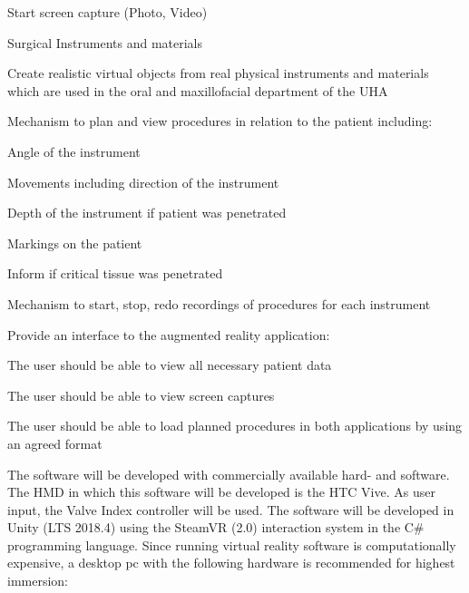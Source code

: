 \begin{compactenum}[label=(\alph*)]
\begin{compactenum}[label=(\alph*)]
            \item Start screen capture (Photo, Video)
        \end{compactenum}
    \item Surgical Instruments and materials
        \begin{compactenum}[label=(\alph*)]
            \item Create realistic virtual objects from real physical instruments and materials which are used in the oral and maxillofacial department of the UHA
            \item Mechanism to plan and view procedures in relation to the patient including:          
                \begin{compactenum}[label=(\alph*)]
                    \item Angle of the instrument
                    \item Movements including direction of the instrument
                    \item Depth of the instrument if patient was penetrated
                    \item Markings on the patient
                    \item Inform if critical tissue was penetrated
                \end{compactenum}
            \item Mechanism to start, stop, redo recordings of procedures for each instrument
        \end{compactenum}
    \item Provide an interface to the augmented reality application:
        \begin{compactenum}[label=(\alph*)]
            \item The user should be able to view all necessary patient data
            \item The user should be able to view screen captures
            \item The user should be able to load planned procedures in both applications by using an agreed format
        \end{compactenum}
\end{compactenum}

The software will be developed with commercially available hard- and software.
The HMD in which this software will be developed is the HTC Vive.
As user input, the Valve Index controller will be used.
The software will be developed in Unity (LTS 2018.4) using the SteamVR (2.0) interaction system in the C\# programming language.
Since running virtual reality software is computationally expensive, a desktop pc with the following hardware is recommended for highest immersion:

